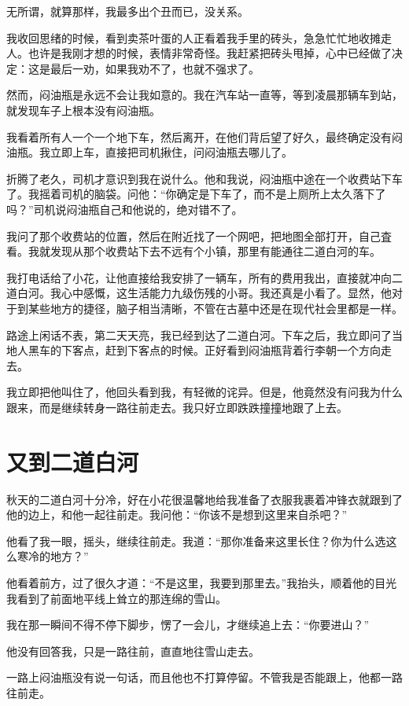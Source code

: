 无所谓，就算那样，我最多出个丑而已，没关系。

我收回思绪的时候，看到卖茶叶蛋的人正看着我手里的砖头，急急忙忙地收摊走人。也许是我刚才想的时候，表情非常奇怪。我赶紧把砖头甩掉，心中已经做了决定：这是最后一劝，如果我劝不了，也就不强求了。

然而，闷油瓶是永远不会让我如意的。我在汽车站一直等，等到凌晨那辆车到站，就发现车子上根本没有闷油瓶。

我看着所有人一个一个地下车，然后离开，在他们背后望了好久，最终确定没有闷油瓶。我立即上车，直接把司机揪住，问闷油瓶去哪儿了。

折腾了老久，司机才意识到我在说什么。他和我说，闷油瓶中途在一个收费站下车了。我摇着司机的脑袋。问他：“你确定是下车了，而不是上厕所上太久落下了吗？”司机说闷油瓶自己和他说的，绝对错不了。

我问了那个收费站的位置，然后在附近找了一个网吧，把地图全部打开，自己査看。我就发现从那个收费站下去不远有个小镇，那里有能通往二道白河的车。

我打电话给了小花，让他直接给我安排了一辆车，所有的费用我出，直接就冲向二道白河。我心中感慨，这生活能力九级伤残的小哥。我还真是小看了。显然，他对于到某些地方的捷径，脑子相当淸晰，不管在古墓中还是在现代社会里都是一样。

路途上闲话不表，第二天天亮，我已经到达了二道白河。下车之后，我立即问了当地人黑车的下客点，赶到下客点的时候。正好看到闷油瓶背着行李朝一个方向走去。

我立即把他叫住了，他回头看到我，有轻微的诧异。但是，他竟然没有问我为什么跟来，而是继续转身一路往前走去。我只好立即跌跌撞撞地跟了上去。

\chapter{又到二道白河}

秋天的二道白河十分冷，好在小花很温馨地给我准备了衣服我裹着冲锋衣就跟到了他的边上，和他一起往前走。我问他：“你该不是想到这里来自杀吧？”

他看了我一眼，摇头，继续往前走。我道：“那你准备来这里长住？你为什么选这么寒冷的地方？”

他看着前方，过了很久才道：“不是这里，我要到那里去。”我抬头，顺着他的目光我看到了前面地平线上耸立的那连绵的雪山。

我在那一瞬间不得不停下脚步，愣了一会儿，才继续追上去：“你要进山？”

他没有回答我，只是一路往前，直直地往雪山走去。

一路上闷油瓶没有说一句话，而且他也不打算停留。不管我是否能跟上，他都一路往前走。


